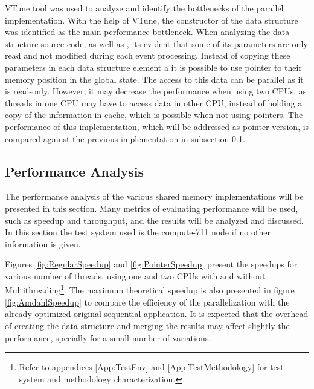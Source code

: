 
\intel VTune tool was used to analyze and identify the bottlenecks of the parallel implementation. With the help of VTune, the constructor of the data structure was identified as the main performance bottleneck. When analyzing the data structure source code, as well as \ttDilepKinFit, its evident that some of its parameters are only read and not modified during each event processing. Instead of copying these parameters in each data structure element a it is possible to use pointer to their memory position in the global state. The access to this data can be parallel as it is read-only. However, it may decrease the performance when using two CPUs, as threads in one CPU may have to access data in other CPU, instead of holding a copy of the information in cache, which is possible when not using pointers. The performance of this implementation, which will be addressed as pointer version, is compared against the previous implementation in subsection \ref{SharedMemPerformance}.

\subsection{Performance Analysis}
\label{SharedMemPerformance}

The performance analysis of the various shared memory implementations will be presented in this section. Many metrics of evaluating performance will be used, such as speedup and throughput, and the results will be analyzed and discussed. In this section the test system used is the compute-711 node if no other information is given.

Figures \ref{fig:RegularSpeedup} and \ref{fig:PointerSpeedup} present the speedups for various number of threads, using one and two CPUs with and without Multithreading\footnote{Refer to appendices \ref{App:TestEnv} and \ref{App:TestMethodology} for test system and methodology characterization.}. The maximum theoretical speedup is also presented in figure \ref{fig:AmdahlSpeedup} to compare the efficiency of the parallelization with the already optimized original sequential application. It is expected that the overhead of creating the data structure and merging the results may affect slightly the performance, specially for a small number of variations.

